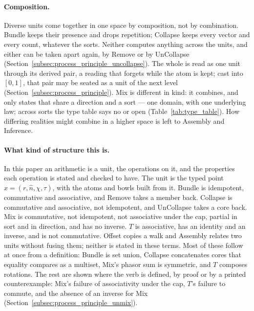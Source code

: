 \documentclass[12pt, a4paper]{article}
\begin{document}
\paragraph{Composition.} Diverse units come together in one space by composition, not by combination. Bundle keeps their presence and drops repetition; Collapse keeps every vector and every count, whatever the sorts. Neither computes anything across the units, and either can be taken apart again, by Remove or by UnCollapse (Section~\ref{subsec:process_principle_uncollapse}). The whole is read as one unit through its derived pair, a reading that forgets while the atom is kept; cast into $[0,1]$, that pair may be seated as a unit of the next level (Section~\ref{subsec:process_principle}). Mix is different in kind: it combines, and only states that share a direction and a sort --- one domain, with one underlying law; across sorts the type table says no or open (Table~\ref{tab:type_table}). How differing realities might combine in a higher space is left to Assembly and Inference.

\paragraph{What kind of structure this is.} In this paper an arithmetic is a unit, the operations on it, and the properties each operation is stated and checked to have. The unit is the typed point $x=(r,\hat n,\chi,\tau)$, with the atoms and bowls built from it. Bundle is idempotent, commutative and associative, and Remove takes a member back. Collapse is commutative and associative, not idempotent, and UnCollapse takes a core back. Mix is commutative, not idempotent, not associative under the cap, partial in sort and in direction, and has no inverse. $T$ is associative, has an identity and an inverse, and is not commutative. Offset copies a walk and Assembly relates two units without fusing them; neither is stated in these terms. Most of these follow at once from a definition: Bundle is set union, Collapse concatenates cores that equality compares as a multiset, Mix's phasor sum is symmetric, and $T$ composes rotations. The rest are shown where the verb is defined, by proof or by a printed counterexample: Mix's failure of associativity under the cap, $T$'s failure to commute, and the absence of an inverse for Mix (Section~\ref{subsec:process_principle_unmix}).
\end{document}
